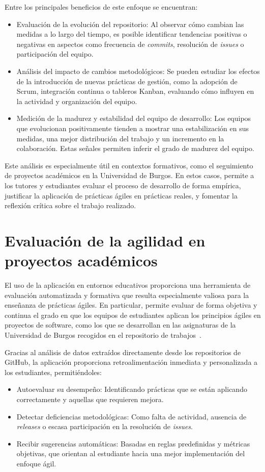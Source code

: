 Entre los principales beneficios de este enfoque se encuentran:

\begin{itemize}
\item Evaluación de la evolución del repositorio: Al observar cómo cambian las medidas a lo largo del tiempo, es posible identificar tendencias positivas o negativas en aspectos como frecuencia de \textit{commits}, resolución de \textit{issues} o participación del equipo.
\item Análisis del impacto de cambios metodológicos: Se pueden estudiar los efectos de la introducción de nuevas prácticas de gestión, como la adopción de Scrum, integración continua o tableros Kanban, evaluando cómo influyen en la actividad y organización del equipo.
\item Medición de la madurez y estabilidad del equipo de desarrollo: Los equipos que evolucionan positivamente tienden a mostrar una estabilización en sus medidas, una mejor distribución del trabajo y un incremento en la colaboración. Estas señales permiten inferir el grado de madurez del equipo.
\end{itemize}

Este análisis es especialmente útil en contextos formativos, como el seguimiento de proyectos académicos en la Universidad de Burgos. En estos casos, permite a los tutores y estudiantes evaluar el proceso de desarrollo de forma empírica, justificar la aplicación de prácticas ágiles en prácticas reales, y fomentar la reflexión crítica sobre el trabajo realizado.

\section{Evaluación de la agilidad en proyectos académicos}
El uso de la aplicación en entornos educativos proporciona una herramienta de evaluación automatizada y formativa que resulta especialmente valiosa para la enseñanza de prácticas ágiles. En particular, permite evaluar de forma objetiva y continua el grado en que los equipos de estudiantes aplican los principios ágiles en proyectos de software, como los que se desarrollan en las asignaturas de la Universidad de Burgos recogidos en el repositorio de trabajos~\cite{riubu}.

Gracias al análisis de datos extraídos directamente desde los repositorios de GitHub, la aplicación proporciona retroalimentación inmediata y personalizada a los estudiantes, permitiéndoles:

\begin{itemize}
\item Autoevaluar su desempeño: Identificando prácticas que se están aplicando correctamente y aquellas que requieren mejora.
\item Detectar deficiencias metodológicas: Como falta de actividad, ausencia de \textit{releases} o escasa participación en la resolución de \textit{issues}.
\item Recibir sugerencias automáticas: Basadas en reglas predefinidas y métricas objetivas, que orientan al estudiante hacia una mejor implementación del enfoque ágil.
\end{itemize}

